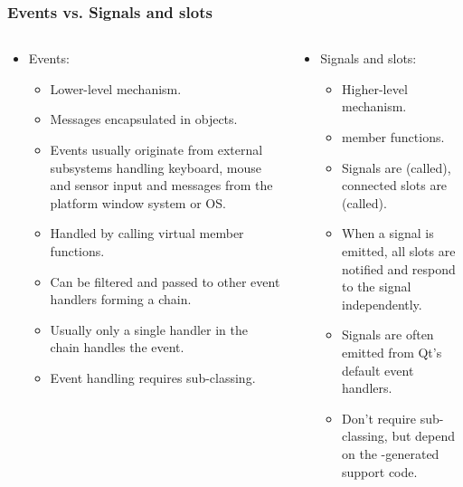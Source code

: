 \begin{frame}[fragile]
  \frametitle{Events vs. Signals and slots}
  \small
  \begin{columns}
    \begin{column}{0.55\textwidth}
    \begin{itemize}
      \item Events:
      \scriptsize
      \begin{itemize}
      \item Lower-level mechanism.
      \item Messages encapsulated in objects.
      \item Events usually originate from external subsystems handling keyboard,
        mouse and sensor input and messages from the platform window system or OS.
      \item Handled by calling virtual member functions.
      \item Can be filtered and passed to other event handlers forming a chain.
      \item Usually only a single handler in the chain handles the event.
      \item Event handling requires sub-classing.
      \end{itemize}
    \end{itemize}
    \end{column}
    \begin{column}{0.45\textwidth}
    \begin{itemize}
      \item Signals and slots:
      \scriptsize
      \begin{itemize}
      \item Higher-level mechanism.
      \item {} member functions.
      \item Signals are  (called), connected slots are 
        (called).
      \item When a signal is emitted, all slots are notified and respond to the
        signal independently.
      \item Signals are often emitted from Qt's default event handlers.
      \item Don't require sub-classing, but depend on the \verb@moc@-generated
        support code.
      \end{itemize}
    \end{itemize}
    \end{column}
  \end{columns}
\end{frame}

